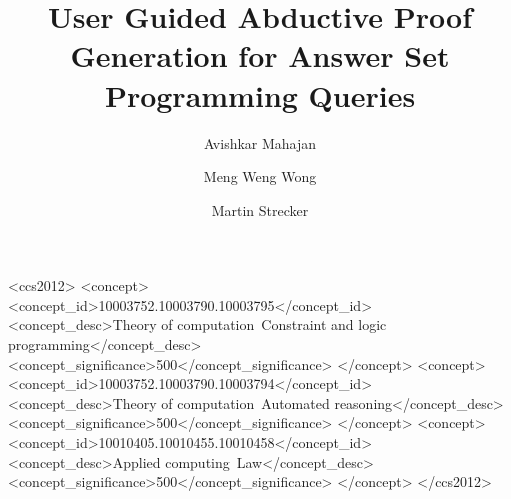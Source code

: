 \documentclass[sigconf]{acmart}
\begin{document}
\title{User Guided Abductive Proof Generation for Answer Set Programming
  Queries}

\author{Avishkar Mahajan}
\author{Meng Weng Wong}

\author{Martin Strecker}



\begin{CCSXML}
<ccs2012>
   <concept>
       <concept_id>10003752.10003790.10003795</concept_id>
       <concept_desc>Theory of computation~Constraint and logic programming</concept_desc>
       <concept_significance>500</concept_significance>
       </concept>
   <concept>
       <concept_id>10003752.10003790.10003794</concept_id>
       <concept_desc>Theory of computation~Automated reasoning</concept_desc>
       <concept_significance>500</concept_significance>
       </concept>
   <concept>
       <concept_id>10010405.10010455.10010458</concept_id>
       <concept_desc>Applied computing~Law</concept_desc>
       <concept_significance>500</concept_significance>
       </concept>
 </ccs2012>
\end{CCSXML}


\maketitle




\cite{lim22:_autom_defeas_reason_law,mahajan22:_overv_cclaw_l4}
\cite{schueller16:_model_variat_first_order_horn,%
mancarella09:_ciff,%
arias19:_const_answer_set_progr_groun_applic,%
beeri91,%
gebser12:_answer_set_solvin_pract%
}








\end{document}
